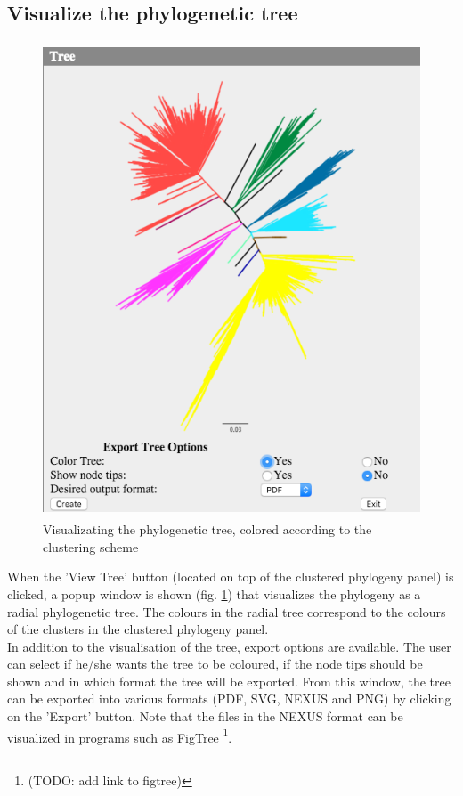 \documentclass[a4paper, 11pt]{article} %
\begin{document}
\subsection{Visualize the phylogenetic tree}
\begin{figure}[H]
\centering
\includegraphics[width=400pt, height=400pt, keepaspectratio=true]{images/view_tree.PNG}
\caption{Visualizating the phylogenetic tree, colored according to the clustering scheme}
\label{fig:view_tree}
\end{figure}
When the 'View Tree' button (located on top of the clustered phylogeny panel) is clicked, a popup window is shown (fig. \ref{fig:view_tree}) that visualizes the phylogeny as a radial phylogenetic tree. The colours in the radial tree correspond to the colours of the clusters in the clustered phylogeny panel.
\\
In addition to the visualisation of the tree, export options are available. The user can select if he/she wants the tree to be coloured, if the node tips should be shown and in which format the tree will be exported. From this window, the tree can be exported into various formats (PDF, SVG, NEXUS and PNG) by clicking on the 'Export' button. Note that the files in the NEXUS format can be visualized in programs such as FigTree \footnote{(TODO: add link to figtree)}.  
\end{document}
